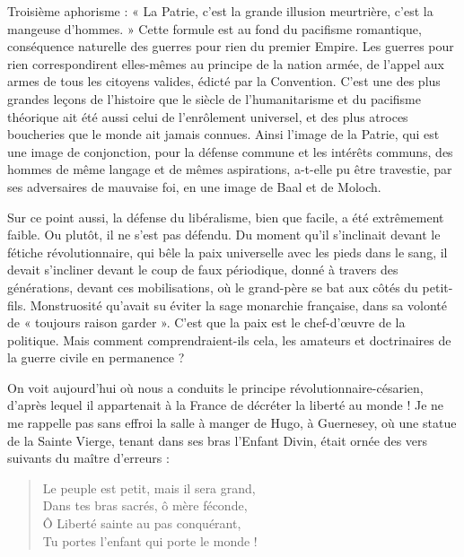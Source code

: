 \documentclass[french,twoside]{book} %
\begin{document}
Troisième aphorisme : « La Patrie, c’est la grande illusion meurtrière, c’est la mangeuse d’hommes. » Cette formule est au fond du pacifisme romantique, conséquence naturelle des guerres pour rien du premier Empire. Les guerres pour rien correspondirent elles-mêmes au principe de la nation armée, de l’appel aux armes de tous les citoyens valides, édicté par la Convention. C’est une des plus grandes leçons de l’histoire que le siècle de l’humanitarisme et du pacifisme théorique ait été aussi celui de l’enrôlement universel, et des plus atroces boucheries que le monde ait jamais connues. Ainsi l’image de la Patrie, qui est une image de conjonction, pour la défense commune et les intérêts communs, des hommes de même langage et de mêmes aspirations, a-t-elle pu être travestie, par ses adversaires de mauvaise foi, en une image de Baal et de Moloch.\par
Sur ce point aussi, la défense du libéralisme, bien que facile, a été extrêmement faible. Ou plutôt, il ne s’est pas défendu. Du moment qu’il s’inclinait devant le fétiche révolutionnaire, qui bêle la paix universelle avec les pieds dans le sang, il devait s’incliner devant le coup de faux périodique, donné à travers des générations, devant ces mobilisations, où le grand-père se bat aux côtés du petit-fils. Monstruosité qu’avait su éviter la sage monarchie française, dans sa volonté de « toujours raison garder ». C’est que la paix est le chef-d’œuvre de la politique. Mais comment comprendraient-ils cela, les amateurs et doctrinaires de la guerre civile en permanence ?\par
On voit aujourd’hui où nous a conduits le principe révolutionnaire-césarien, d’après lequel il appartenait à la France de décréter la liberté au monde ! Je ne me rappelle pas sans effroi la salle à manger de Hugo, à Guernesey, où une statue de la Sainte Vierge, tenant dans ses bras l’Enfant Divin, était ornée des vers suivants du maître d’erreurs :\par


\begin{verse}
Le peuple est petit, mais il sera grand,\\
Dans tes bras sacrés, ô mère féconde,\\
Ô Liberté sainte au pas conquérant,\\
Tu portes l’enfant qui porte le monde !\\
\end{verse}
\end{document}
